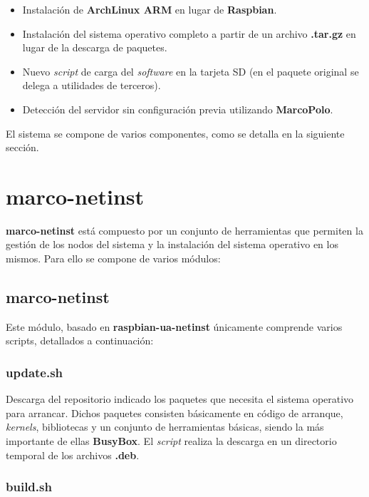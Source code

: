 \documentclass{article}
\begin{document}
\begin{itemize}
	\item Instalación de \textbf{ArchLinux ARM} en lugar de \textbf{Raspbian}.
	\item Instalación del sistema operativo completo a partir de un archivo \textbf{.tar.gz} en lugar de la descarga de paquetes.
	\item Nuevo \textit{script} de carga del \textit{software} en la tarjeta SD (en el paquete original se delega a utilidades de terceros).
	\item Detección del servidor sin configuración previa utilizando \textbf{MarcoPolo}.
\end{itemize}

El sistema se compone de varios componentes, como se detalla en la siguiente sección.

\section{marco-netinst}

\textbf{marco-netinst} está compuesto por un conjunto de herramientas que permiten la gestión de los nodos del sistema y la instalación del sistema operativo en los mismos. Para ello se compone de varios módulos:

\subsection{marco-netinst}

Este módulo, basado en \textbf{raspbian-ua-netinst} únicamente comprende varios scripts, detallados a continuación:

\subsubsection*{update.sh}

Descarga del repositorio indicado los paquetes que necesita el sistema operativo para arrancar. Dichos paquetes consisten básicamente en código de arranque, \textit{kernels}, bibliotecas y un conjunto de herramientas básicas, siendo la más importante de ellas \textbf{BusyBox}. El \textit{script} realiza la descarga en un directorio temporal de los archivos \textbf{.deb}.

\subsubsection*{build.sh}
\end{document}
